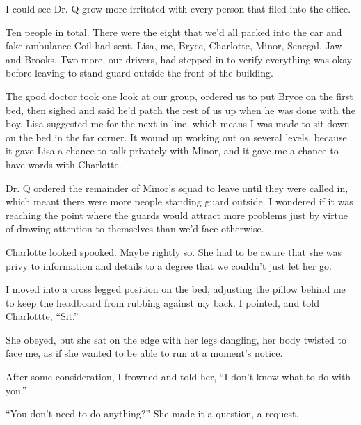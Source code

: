 





I could see Dr. Q grow more irritated with every person that filed into the office.



Ten people in total.  There were the eight that we'd all packed into the car and fake ambulance Coil had sent.  Lisa, me, Bryce, Charlotte, Minor, Senegal, Jaw and Brooks.  Two more, our drivers, had stepped in to verify everything was okay before leaving to stand guard outside the front of the building.



The good doctor took one look at our group, ordered us to put Bryce on the first bed, then sighed and said he'd patch the rest of us up when he was done with the boy.  Lisa suggested me for the next in line, which means I was made to sit down on the bed in the far corner.  It wound up working out on several levels, because it gave Lisa a chance to talk privately with Minor, and it gave me a chance to have words with Charlotte.



Dr. Q ordered the remainder of Minor's squad to leave until they were called in, which meant there were more people standing guard outside.  I wondered if it was reaching the point where the guards would attract more problems just by virtue of drawing attention to themselves than we'd face otherwise.



Charlotte looked spooked.  Maybe rightly so.  She had to be aware that she was privy to information and details to a degree that we couldn't just let her go.



I moved into a cross legged position on the bed, adjusting the pillow behind me to keep the headboard from rubbing against my back.  I pointed, and told Charlottte, ``Sit.''



She obeyed, but she sat on the edge with her legs dangling, her body twisted to face me, as if she wanted to be able to run at a moment's notice.



After some consideration, I frowned and told her, ``I don't know what to do with you.''



``You don't need to do anything?'' She made it a question, a request.



